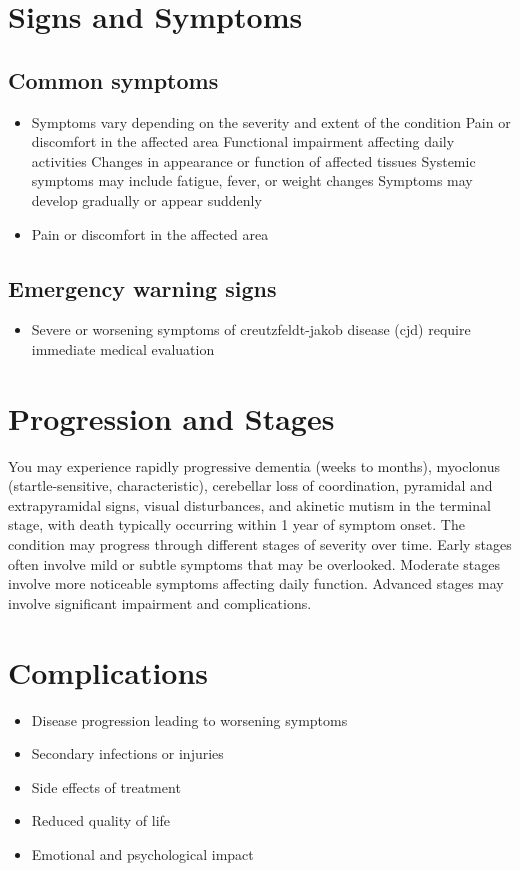 \section{Signs and Symptoms}

\subsection{Common symptoms}
\begin{itemize}[noitemsep]
  \item Symptoms vary depending on the severity and extent of the condition Pain or discomfort in the affected area Functional impairment affecting daily activities Changes in appearance or function of affected tissues Systemic symptoms may include fatigue, fever, or weight changes Symptoms may develop gradually or appear suddenly
  \item Pain or discomfort in the affected area
  \end{itemize}

\subsection{Emergency warning signs}
\begin{itemize}[noitemsep]
  \item Severe or worsening symptoms of creutzfeldt-jakob disease (cjd) require immediate medical evaluation
\end{itemize}
\section{Progression and Stages}
You may experience rapidly progressive dementia (weeks to months), myoclonus (startle-sensitive, characteristic), cerebellar loss of coordination, pyramidal and extrapyramidal signs, visual disturbances, and akinetic mutism in the terminal stage, with death typically occurring within 1 year of symptom onset. The condition may progress through different stages of severity over time. Early stages often involve mild or subtle symptoms that may be overlooked. Moderate stages involve more noticeable symptoms affecting daily function. Advanced stages may involve significant impairment and complications.
\section{Complications}
\begin{itemize}[noitemsep]
  \item Disease progression leading to worsening symptoms
  \item Secondary infections or injuries
  \item Side effects of treatment
  \item Reduced quality of life
  \item Emotional and psychological impact
\end{itemize}
